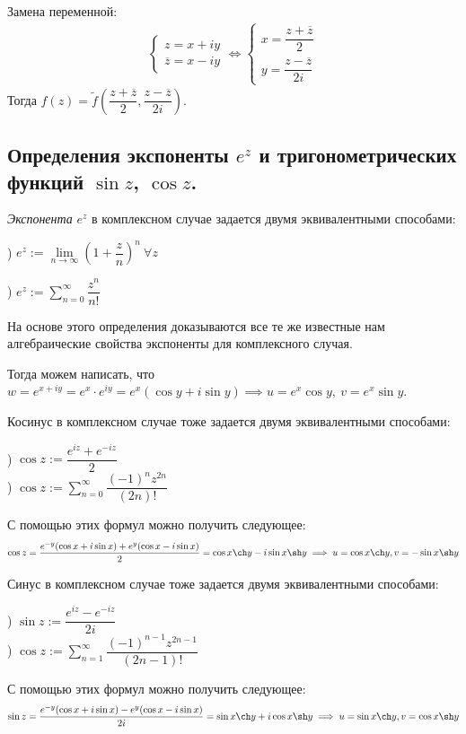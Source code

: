  Замена переменной:
 \begin{align*}
 \begin{cases}
 	z = x + iy \\
 	\overline{z} = x - iy
 \end{cases} \iff 
 \begin{cases}
 x = \dfrac{z + \overline{z}}{2} \\
 y = \dfrac{z - \overline{z}}{2i}
 \end{cases} 
 \end{align*}
 Тогда $f(z) = \widetilde{f}\left(\dfrac{z + \overline{z}}{2}, \dfrac{z - \overline{z}}{2i}\right)$.
 
 \subsection*{Определения экспоненты $e^z$ и тригонометрических функций $\sin z$, $\cos z$.}
 
 \begin{definition*}  \textit{Экспонента} $e^z$ в комплексном случае задается двумя  эквивалентными способами:
 	
 	) $e^z := \lim\limits_{n \to \infty} \left(1 + \dfrac zn\right)^n\ \forall z$
 	
 	) $e^z := \sum_{n = 0}^{\infty} \dfrac{z^n}{n!}$
 		
 	На основе этого определения доказываются все те же известные нам алгебраические свойства экспоненты для комплексного случая. 
 \end{definition*}

Тогда можем написать, что $w = e^{x + iy} = e^x \cdot e^{iy} = e^x(\cos y + i\sin y) \implies u  = e^x\cos y,\ v = e^x\sin y$.

\begin{definition*} Косинус в комплексном случае тоже задается двумя эквивалентными способами:
	
	) $\cos z := \dfrac{e^{iz} + e^{-iz}}{2}$ \\
	
	) $\cos z := \sum_{n = 0}^{\infty} \dfrac{(-1)^n z^{2n}}{(2n)!}$
	
	С помощью этих формул можно получить следующее: $$
	\cos z = \dfrac{e^{-y}(\cos x + i\sin x) + e^{y}(\cos x - i\sin x)}{2} = \cos x \ch y - i \sin x \sh y \implies  u =  \cos x \ch y, v = -\sin x \sh y $$
\end{definition*} 


\begin{definition*} Синус в комплексном случае тоже задается двумя эквивалентными способами:
	
	) $\sin z := \dfrac{e^{iz} - e^{-iz}}{2i}$ \\
	
	) $\cos z := \sum_{n = 1}^{\infty} \dfrac{(-1)^{n - 1} z^{2n - 1}}{(2n - 1)!}$
	
	С помощью этих формул можно получить следующее: $$
	\sin z =  \dfrac{e^{-y}(\cos x + i\sin x) - e^{y}(\cos x - i\sin x)}{2i} = \sin x \ch y + i \cos x \sh y \implies  u =  \sin x \ch y, v = \cos x \sh y$$
\end{definition*} 


